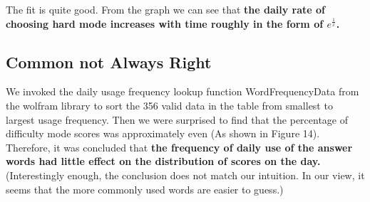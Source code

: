\documentclass[12pt]{article}
\begin{document}
 The fit is quite good. From the graph we can see that \textbf{the daily rate of choosing hard mode increases with time roughly in the form of $e^{\frac{1}{x}}$.}




 \subsection{Common not Always Right}

We invoked the daily usage frequency lookup function WordFrequencyData from the wolfram library to sort the 356 valid data in the table from smallest to largest usage frequency. 
Then we were surprised to find that the percentage of difficulty mode scores was approximately even
(As shown in Figure 14).
Therefore, it was concluded that \textbf{the frequency of daily use of the answer words had little effect on the distribution of scores on the day.}
(Interestingly enough, the conclusion does not match our intuition. In our view, it seems that the more commonly used words are easier to guess.)
\end{document}
